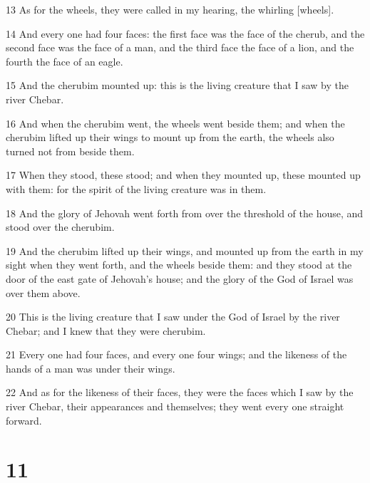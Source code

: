 \par 13 As for the wheels, they were called in my hearing, the whirling [wheels].
\par 14 And every one had four faces: the first face was the face of the cherub, and the second face was the face of a man, and the third face the face of a lion, and the fourth the face of an eagle.
\par 15 And the cherubim mounted up: this is the living creature that I saw by the river Chebar.
\par 16 And when the cherubim went, the wheels went beside them; and when the cherubim lifted up their wings to mount up from the earth, the wheels also turned not from beside them.
\par 17 When they stood, these stood; and when they mounted up, these mounted up with them: for the spirit of the living creature was in them.
\par 18 And the glory of Jehovah went forth from over the threshold of the house, and stood over the cherubim.
\par 19 And the cherubim lifted up their wings, and mounted up from the earth in my sight when they went forth, and the wheels beside them: and they stood at the door of the east gate of Jehovah's house; and the glory of the God of Israel was over them above.
\par 20 This is the living creature that I saw under the God of Israel by the river Chebar; and I knew that they were cherubim.
\par 21 Every one had four faces, and every one four wings; and the likeness of the hands of a man was under their wings.
\par 22 And as for the likeness of their faces, they were the faces which I saw by the river Chebar, their appearances and themselves; they went every one straight forward.

\chapter{11}

